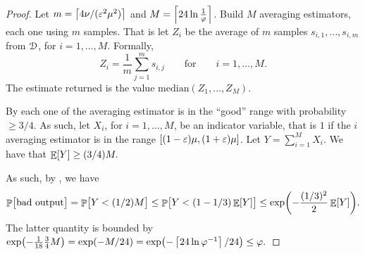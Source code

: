 \begin{proof}
    Let $m = \bigl\lceil{ {4 \nu}/({\varepsilon}^2\mu^2) } \bigr\rceil$ and
    $M = \left\lceil {24 \ln \frac{1}{\varphi}} \right\rceil$. Build $M$ averaging
    estimators, each one using $m$ samples.  That is let $Z_i$ be the
    average of $m$ samples $s_{i,1}, \ldots, s_{i, m}$ from
    $\EuScript{D}$, for $i=1, \ldots, M$. Formally,
    \begin{equation*}
        Z_i = \frac{1}{m} \sum_{j=1}^m s_{i,j}
        \qquad
        \text{for}\qquad i=1,\ldots, M.
    \end{equation*}
    The estimate returned is the value
    $\mathrm{median}( Z_1, \ldots, Z_{M} )$.

    By  each one of the averaging
    estimator is in the ``good'' range with probability $\geq 3/4$. As
    such, let $X_i$, for $i=1,\ldots, M$, be an indicator variable,
    that is $1$ if the $i$\th averaging estimator is in the range
    $[(1-{\varepsilon})\mu,(1+{\varepsilon})\mu]$. Let $Y = \sum_{i=1}^{M}X_i$. We have
    that
    \begin{math}
        \mathop{\mathbb{E}}\!\left[ {Y} \right] \geq (3/4)M.
    \end{math}

    As such, by , we have
    \begin{equation*}
        \Prob{\bigl. \text{bad output}}
        =%
        \Prob{\bigl.Y < (1/2)M}
        \leq
        \Prob{\bigl.Y < (1-1/3) \Ex{Y}}
        \leq
        \exp\pth{ - \frac{(1/3)^2}{2}\Ex{Y}}.
    \end{equation*}
    The latter quantity is bounded by
    \begin{math}
        \exp\pth{ - \frac{1}{18} \frac{3}{4} M} = \exp( -M/24)=
        \exp\pth{ - \ceil{24 \ln \BadProb^{-1}} /24 } \leq%
        \BadProb.
    \end{math}
\end{proof}





